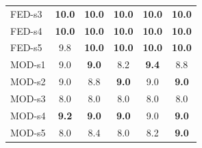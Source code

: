 \documentclass[drones,article,accept,pdftex,moreauthors]{Definitions/mdpi}
\begin{document}
\begin{table}[H]
\begin{tabularx}{\textwidth}{@{}lCCCCC@{}}
FED-s3 & \textbf{10.0} & \textbf{10.0} & \textbf{10.0} & \textbf{10.0} & \textbf{10.0} \\
FED-s4 & \textbf{10.0} & \textbf{10.0} & \textbf{10.0} & \textbf{10.0} & \textbf{10.0} \\
FED-s5 & 9.8 & \textbf{10.0} & \textbf{10.0} & \textbf{10.0} & \textbf{10.0} \\
\midrule
MOD-s1 & 9.0 & \textbf{9.0} & 8.2 & \textbf{9.4} & 8.8 \\
MOD-s2 & 9.0 & 8.8 & \textbf{9.0} & 9.0 & \textbf{9.0} \\
MOD-s3 & 8.0 & 8.0 & 8.0 & 8.0 & 8.0 \\
MOD-s4 & \textbf{9.2} & \textbf{9.0} & \textbf{9.0} & 9.0 & \textbf{9.0} \\
MOD-s5 & 8.0 & 8.4 & 8.0 & 8.2 & \textbf{9.0} \\
\bottomrule
\end{tabularx}
\end{table}
\end{document}
